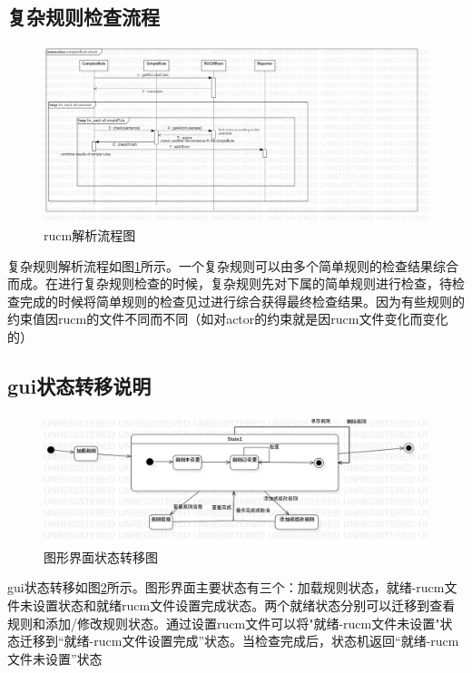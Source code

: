\subsection{复杂规则检查流程}
	\begin{figure}
	\centering
	\includegraphics[width=1\textwidth]{./src/sequence_complexCheck.jpg} 
	\caption{rucm解析流程图} 
	\label{sequence_complexCheck}
	\end{figure}
	复杂规则解析流程如图\ref{sequence_complexCheck}所示。一个复杂规则可以由多个简单规则的检查结果综合而成。在进行复杂规则检查的时候，复杂规则先对下属的简单规则进行检查，待检查完成的时候将简单规则的检查见过进行综合获得最终检查结果。因为有些规则的约束值因rucm的文件不同而不同（如对actor的约束就是因rucm文件变化而变化的）

\subsection{gui状态转移说明}
	\begin{figure}
	\centering
	\includegraphics[width=1\textwidth]{./src/stateDisgram_gui.jpg} 
	\caption{图形界面状态转移图} 
	\label{stateDisgram_gui}
	\end{figure}
	gui状态转移如图\ref{stateDisgram_gui}所示。图形界面主要状态有三个：加载规则状态，就绪-rucm文件未设置状态和就绪rucm文件设置完成状态。两个就绪状态分别可以迁移到查看规则和添加/修改规则状态。通过设置rucm文件可以将"就绪-rucm文件未设置"状态迁移到“就绪-rucm文件设置完成”状态。当检查完成后，状态机返回“就绪-rucm文件未设置”状态
	
	
	
	